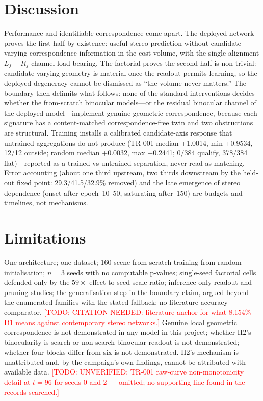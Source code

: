 \documentclass[conference]{IEEEtran}
\newcommand{\todo}[1]{\textcolor{red}{[TODO: #1]}}
\begin{document}
\section{Discussion}
\label{sec:discussion}

Performance and identifiable correspondence come apart. The deployed network proves the first half by existence: useful stereo prediction without candidate-varying correspondence information in the cost volume, with the single-alignment $L_f - R_f$ channel load-bearing. The factorial proves the second half is non-trivial: candidate-varying geometry is material once the readout permits learning, so the deployed degeneracy cannot be dismissed as ``the volume never matters.'' The boundary then delimits what follows: none of the standard interventions decides whether the from-scratch binocular models---or the residual binocular channel of the deployed model---implement genuine geometric correspondence, because each signature has a content-matched correspondence-free twin and two obstructions are structural. Training installs a calibrated candidate-axis response that untrained aggregations do not produce (TR-001 median +1.0014, min +0.9534, 12/12 outside; random median +0.0032, max +0.2441; 0/384 qualify, 378/384 flat)---reported as a trained-vs-untrained separation, never read as matching. Error accounting (about one third upstream, two thirds downstream by the held-out fixed point: 29.3/41.5/32.9\% removed) and the late emergence of stereo dependence (onset after epoch~10--50, saturating after~150) are budgets and timelines, not mechanisms.

\section{Limitations}
\label{sec:limitations}

One architecture; one dataset; 160-scene from-scratch training from random initialisation; $n=3$ seeds with no computable p-values; single-seed factorial cells defended only by the $59\times$ effect-to-seed-scale ratio; inference-only readout and pruning studies; the generalisation step in the boundary claim, argued beyond the enumerated families with the stated fallback; no literature accuracy comparator. \todo{CITATION NEEDED: literature anchor for what 8.154\% D1 means against contemporary stereo networks.} Genuine local geometric correspondence is not demonstrated in any model in this project; whether H2's binocularity is search or non-search binocular readout is not demonstrated; whether four blocks differ from six is not demonstrated. H2's mechanism is unattributed and, by the campaign's own findings, cannot be attributed with available data. \todo{UNVERIFIED: TR-001 raw-curve non-monotonicity detail at $t=96$ for seeds 0 and 2 --- omitted; no supporting line found in the records searched.}
\end{document}
